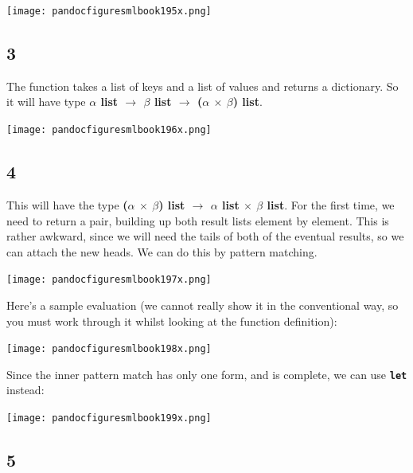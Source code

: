 \documentclass[]{book}
\begin{document}
\medskip
\begin{center}
\noindent\texttt{[image: pandocfiguresmlbook195x.png]}
\end{center}
\medskip

\subsection*{3}
The function takes a list of keys and a list of values and returns a dictionary. So it will have type \textbf{\textsf{$\alpha$ list $\rightarrow$ $\beta$ list $\rightarrow$ \textmd{(}$\alpha$ $\times$ $\beta$\textmd{)} list}}.

\medskip
\begin{center}
\noindent\texttt{[image: pandocfiguresmlbook196x.png]}
\end{center}
\medskip

\subsection*{4}
This will have the type \textsf{\textbf{\textmd{ (}$\alpha$ $\times$ $\beta$\textmd{)} list $\rightarrow$ $\alpha$ list $\times$ $\beta$ list}}. For the first time, we need to return a pair, building up both result lists element by element. This is rather awkward, since we will need the tails of both of the eventual results, so we can attach the new heads. We can do this by pattern matching.

\medskip
\begin{center}
\noindent\texttt{[image: pandocfiguresmlbook197x.png]}
\end{center}
\medskip

\noindent Here's a sample evaluation (we cannot really show it in the conventional way, so you must work through it whilst looking at the function definition):

\medskip
\begin{center}
\noindent\texttt{[image: pandocfiguresmlbook198x.png]}
\end{center}
\medskip

\noindent Since the inner pattern match has only one form, and is complete, we can use \textbf{\texttt{let}} instead:

\medskip
\begin{center}
\noindent\texttt{[image: pandocfiguresmlbook199x.png]}
\end{center}
\medskip

\subsection*{5}
\end{document}
